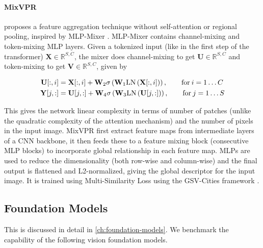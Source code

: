 \paragraph{MixVPR \cite{Alibey2023MixVPRFM}} proposes a feature
aggregation technique without self-attention or regional pooling,
inspired by MLP-Mixer \cite{Tolstikhin2021MLPMixerAA}. MLP-Mixer
contains channel-mixing and token-mixing MLP layers. Given a tokenized
input (like in the first step of the transformer) $\mathbf{X} \in
\mathbb{R}^{S, C}$, the mixer does channel-mixing to get
$\mathbf{U} \in \mathbb{R}^{S, C}$ and token-mixing to get
$\mathbf{V} \in \mathbb{R}^{S, C}$, given by

\begin{align}
    \mathbf{U}[:, i] &= \mathbf{X}[:, i] + \mathbf{W}_2 \sigma \left(
        \mathbf{W}_1 \mathrm{LN}\left(\mathbf{X}[:, i]\right)\right),
        \qquad \textup{for}\: i = 1 \dots C \\
    \mathbf{Y}[j, :] &= \mathbf{U}[j, :] + \mathbf{W}_4 \sigma \left(
        \mathbf{W}_3 \mathrm{LN}\left(\mathbf{U}[j, :]\right)\right),
        \qquad \textup{for}\: j = 1 \dots S
\end{align}

This gives the network linear complexity in terms of number of patches
(unlike the quadratic complexity of the attention mechanism) and the
number of pixels in the input image. MixVPR first extract feature maps
from intermediate layers of a CNN backbone, it then feeds these to a
feature mixing block (consecutive MLP blocks) to incorporate global
relationship in each feature map. MLPs are used to reduce the
dimensionality (both row-wise and column-wise) and the final output is
flattened and L2-normalized, giving the global descriptor for the
input image. It is trained using Multi-Similarity Loss
\cite{Wang2019MultiSimilarityLW} using the GSV-Cities framework
\cite{Alibey2022GSVCitiesTA}.

\subsection{Foundation Models}

This is discussed in detail in \cref{ch:foundation-models}. We
benchmark the capability of the following vision foundation models.


